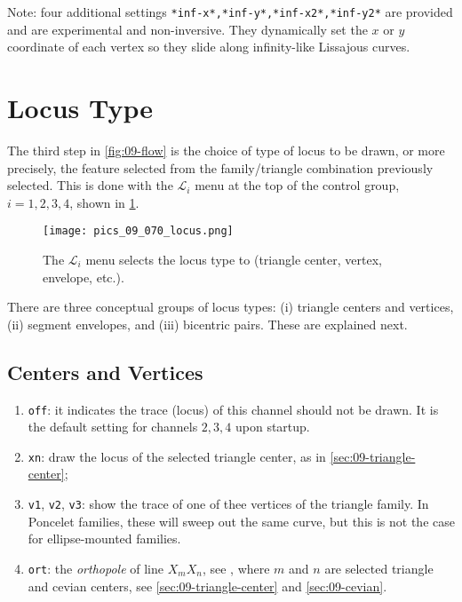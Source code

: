 Note: four additional settings \texttt{*inf-x*,*inf-y*,*inf-x2*,*inf-y2*} are provided and are experimental and non-inversive. They dynamically set the $x$ or $y$ coordinate of each vertex so they slide along infinity-like Lissajous curves. 

\section{Locus Type}

The third step in \cref{fig:09-flow} is the choice of type of locus to be drawn, or more precisely, the feature selected from the family/triangle combination previously selected. This is done with the $\mathcal{L}_i$ menu at the top of the control group, $i=1,2,3,4$, shown in \cref{fig:09-menu-locus}.

\begin{figure}
    \centering
    \texttt{[image: pics\_09\_070\_locus.png]}
    \caption{The $\mathcal{L}_i$ menu selects the locus type to (triangle center, vertex, envelope, etc.).}
    \label{fig:09-menu-locus}
\end{figure}

There are three conceptual groups of locus types: (i) triangle centers and vertices, (ii) segment envelopes, and (iii) bicentric pairs. These are explained next.

\subsection{Centers and Vertices}

\begin{enumerate}
\item \texttt{off}: it indicates the trace (locus) of this channel should not be drawn. It is the default setting for channels $2,3,4$ upon startup.
\item \texttt{xn}: draw the locus of the selected triangle center, as in  \cref{sec:09-triangle-center};
\item \texttt{v1}, \texttt{v2}, \texttt{v3}: show the trace of one of thee vertices of the triangle family. In Poncelet families, these will sweep out the same curve, but this is not the case for ellipse-mounted families.
\item \texttt{ort}: the {\em orthopole} of line $X_m X_n$, see \cite[Orthopole]{mw}, where $m$ and $n$ are selected triangle and cevian centers, see \cref{sec:09-triangle-center} and \cref{sec:09-cevian}.
\end{enumerate}

